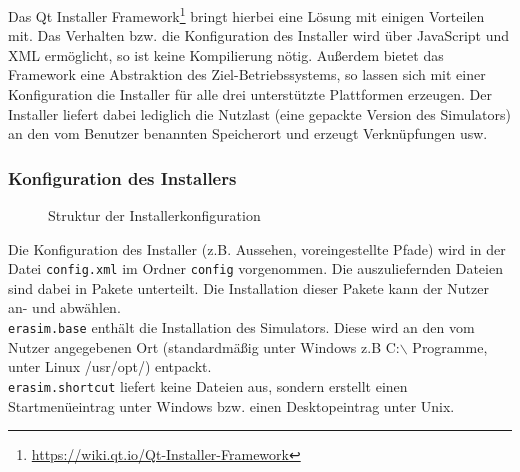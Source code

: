 Das Qt Installer Framework\footnote{\url{https://wiki.qt.io/Qt-Installer-Framework}} bringt hierbei eine Lösung mit einigen Vorteilen mit. Das Verhalten bzw. die Konfiguration des Installer wird über JavaScript und XML ermöglicht, so ist keine Kompilierung nötig. Außerdem bietet das Framework eine Abstraktion des Ziel-Betriebssystems, so lassen sich mit einer Konfiguration die Installer für alle drei unterstützte Plattformen erzeugen. Der Installer liefert dabei lediglich die Nutzlast (eine gepackte Version des Simulators) an den vom Benutzer benannten Speicherort und erzeugt Verknüpfungen usw.

\subsubsection{Konfiguration des Installers}
\begin{figure}[H]
	\begin{center}
	\end{center}
	
	\caption{Struktur der Installerkonfiguration}
	\label{dev-manual-installer}
\end{figure}
Die Konfiguration des Installer (z.B. Aussehen, voreingestellte Pfade) wird in der Datei \texttt{config.xml} im Ordner \texttt{config} vorgenommen. Die auszuliefernden Dateien sind dabei in Pakete unterteilt. Die Installation dieser Pakete kann der Nutzer an- und abwählen.\\
\texttt{erasim.base} enthält die Installation des Simulators. Diese wird an den vom Nutzer angegebenen Ort (standardmäßig unter Windows z.B C:$\backslash$ Programme, unter Linux /usr/opt/) entpackt.\\
\texttt{erasim.shortcut} liefert keine Dateien aus, sondern erstellt einen Startmenüeintrag unter Windows bzw. einen Desktopeintrag unter Unix.

